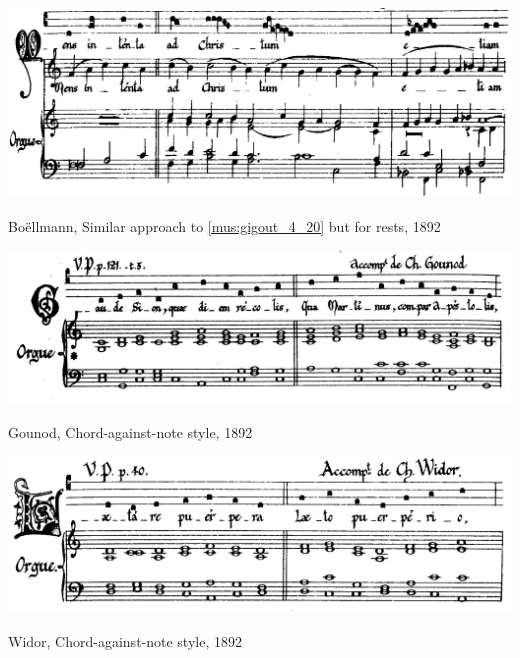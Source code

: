 \vspace*{\fill}

\begin{example}
  \centering
  \includegraphics[width=\linewidth]{c/3/ex/boellmann_3_7.png}
  \caption{Boëllmann, Similar approach to \cref{mus:gigout_4_20} but for rests, 1892}
  \label{mus:boellmann_3_7}
\end{example}

\vspace*{\fill}

\clearpage

\vspace*{\fill}

\begin{example}
  \centering
  \includegraphics[width=\linewidth]{c/3/ex/gounod_3_18.jpg}
  \caption{Gounod, Chord-against-note style, 1892}
  \label{mus:gounod_3_18}
\end{example}

\vspace*{\fill}

\begin{example}
  \centering
  \includegraphics[width=\linewidth]{c/3/ex/widor_2_1.jpg}
  \caption{Widor, Chord-against-note style, 1892}
  \label{mus:widor_2_1}
\end{example}

